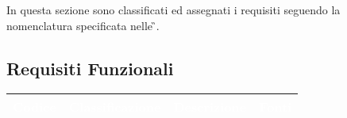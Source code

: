 In questa sezione sono classificati ed assegnati i requisiti seguendo la nomenclatura specificata nelle \NdP\G{}.

\subsection{Requisiti Funzionali}

{
      \setlength{\freewidth}{\dimexpr\textwidth-10\tabcolsep}
      \renewcommand{\arraystretch}{1.5}
      \centering
      \setlength{\aboverulesep}{0pt}
      \setlength{\belowrulesep}{0pt}
      \begin{longtable}{C{.15\freewidth} C{.2\freewidth} C{.528\freewidth} C{.15\freewidth}}
         \toprule
      \textcolor{white}{\textbf{Codice}}&
      \textcolor{white}{\textbf{Classificazione}}&
      \textcolor{white}{\textbf{Descrizione}}&
      \textcolor{white}{\textbf{Fonti}}\\	
      \toprule
      \endhead
      

\end{longtable}}
